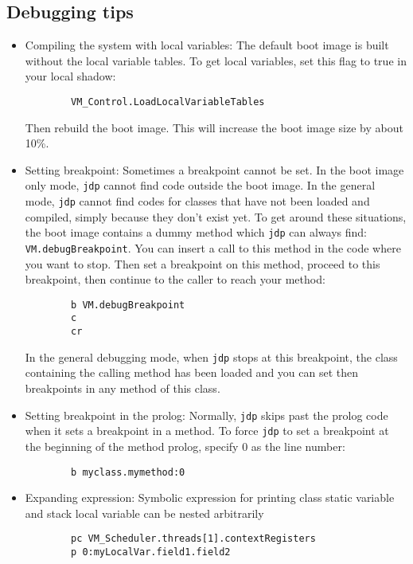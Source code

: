 \subsection{Debugging tips}

\begin{itemize}
\item Compiling the system with local variables:
  The default boot image is built without the local variable tables.
  To get local variables, set this flag to true in your local shadow:
\begin{verbatim}
        VM_Control.LoadLocalVariableTables
\end{verbatim}
  Then rebuild the boot image. This will increase the boot image size 
  by about 10\%.

\item Setting breakpoint:
  Sometimes a breakpoint cannot be set.  In the boot image only mode, {\tt jdp}
  cannot find code outside the boot image.  In the general mode, {\tt jdp} cannot
  find codes for classes that have not been loaded and compiled, simply
  because they don't exist yet.  To get around these
  situations, the boot image contains a dummy method which {\tt jdp} can always
  find:
        {\tt VM.debugBreakpoint}.  
  You can insert a call to this method in the code where you want to stop.
  Then set a breakpoint on this method, proceed to this breakpoint, then
  continue to the caller to reach your method:
\begin{verbatim}
        b VM.debugBreakpoint
        c
        cr
\end{verbatim}
  In the general debugging mode, when {\tt jdp} stops at this breakpoint, the 
  class containing the calling method has been loaded and you can set then
  breakpoints in any method of this class.


\item Setting breakpoint in the prolog:
  Normally, {\tt jdp} skips past the prolog code when it sets a breakpoint in
  a method.  To force {\tt jdp} to set a breakpoint at the beginning of the
  method prolog, specify 0 as the line number:
\begin{verbatim}
        b myclass.mymethod:0
\end{verbatim}


\item Expanding expression:
  Symbolic expression for printing class static variable and stack local
  variable can be nested arbitrarily
\begin{verbatim}
        pc VM_Scheduler.threads[1].contextRegisters
        p 0:myLocalVar.field1.field2
\end{verbatim}



\end{itemize}
